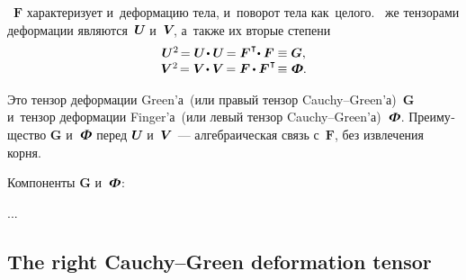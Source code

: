\begin{otherlanguage}{russian}

~$\bm{F}$ характеризует и~деформацию тела, и~поворот тела как~целого. ~же тензорами деформации являются~${\bm{U}\hspace{-0.25ex}}$ и~${\bm{V}\hspace{-0.4ex}}$, а~также их вторые степени
\nopagebreak\vspace{.12em}\begin{equation}\label{deformationmeasures}
\begin{array}{c}
\bm{U}^2 \hspace{-0.32ex} = \bm{U} \hspace{-0.32ex} \dotp \bm{U} \hspace{-0.25ex} = \bm{F}^{\hspace{.1ex}\T} \hspace{-0.5ex} \dotp \bm{F} \equiv \bm{G} , \\[.1ex]
\bm{V}^2 \hspace{-0.32ex} = \bm{V} \hspace{-0.32ex} \dotp \bm{V} \hspace{-0.25ex} = \bm{F} \hspace{-0.1ex} \dotp \bm{F}^{\hspace{.1ex}\T} \hspace{-0.36ex} \equiv \mathboldPhi .
\end{array}
\end{equation}

\vspace{-0.25em} \noindent Это тензор деформации Green’а~(или правый тензор Cauchy--Green’а)~$\bm{G}$ и~тензор деформации Finger’а~(или левый тензор Cauchy--Green’а)~$\mathboldPhi$. Пре\-иму\-щест\-во $\bm{G}$ и~$\mathboldPhi$ перед ${\bm{U}\hspace{-0.25ex}}$ и~${\bm{V}\hspace{-0.25ex}}$~--- алгебраическая связь с~$\bm{F}$, без извлечения корня.

Компоненты $\bm{G}$ и~$\mathboldPhi$:

...

\end{otherlanguage}

\subsection*{The right Cauchy\hbox{--}Green deformation tensor}

